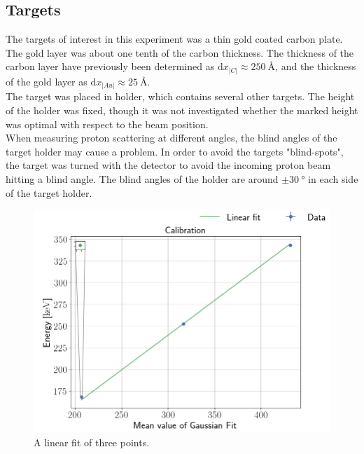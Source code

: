\subsection{Targets}
The targets of interest in this experiment was a thin gold coated carbon plate.
The gold layer was about one tenth of the carbon thickness. The thickness of
the carbon layer have previously been determined as $\mathrm{d}x_|C|
\approx\SI{250}{\angstrom}$, and the thickness of the gold layer as
$\mathrm{d}x_|Au|\approx\SI{25}{\angstrom}$.\footnotemark \\
The target was placed in holder, which
contains several other targets. The height of the holder was fixed, though it
was not investigated whether the marked height was optimal with respect to the
beam position.\\
%
When measuring proton scattering at different angles, the blind angles of the target holder may cause a problem. In order to avoid the targets "blind-spots", the target was turned with the detector to avoid the incoming proton beam hitting a blind angle. The blind angles of the holder are around $\pm \SI{30}{\degree}$ in each side of the target holder.
\begin{figure}[t]
\centering
\includegraphics[width=0.99\columnwidth]{alpha_plotting}
\caption{A linear fit of three points.}
\label{fig_linear_fit2}
\end{figure}
\vspace*{20cm}

